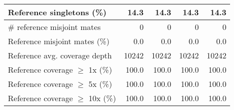 \documentclass[12pt,a4paper]{article}
\begin{document}
\begin{table}[ht]
\begin{center}
\begin{tabular}{|l*{4}{|r}|}
Reference singletons (\%) & 14.3 & 14.3 & 14.3 & 14.3 \\ \hline
\# reference misjoint mates & 0 & 0 & 0 & 0 \\ \hline
Reference misjoint mates (\%) & 0.0 & 0.0 & 0.0 & 0.0 \\ \hline
Reference avg. coverage depth & 10242 & 10242 & 10242 & 10242 \\ \hline
Reference coverage $\geq$ 1x (\%) & 100.0 & 100.0 & 100.0 & 100.0 \\ \hline
Reference coverage $\geq$ 5x (\%) & 100.0 & 100.0 & 100.0 & 100.0 \\ \hline
Reference coverage $\geq$ 10x (\%) & 100.0 & 100.0 & 100.0 & 100.0 \\ \hline
\end{tabular}
\end{center}
\end{table}
\end{document}
